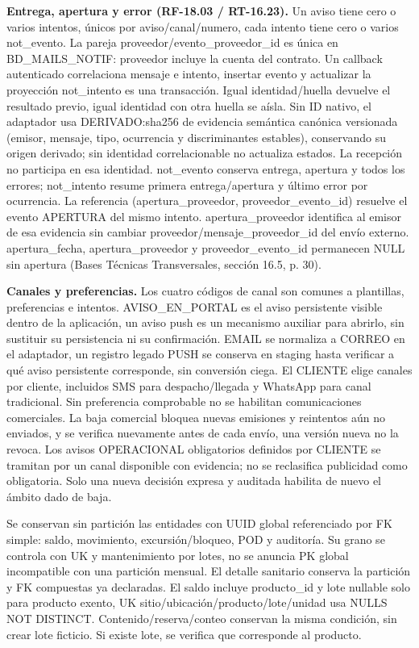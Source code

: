 \textbf{Entrega, apertura y error (RF-18.03 / RT-16.23).} Un aviso tiene cero o varios intentos, únicos por aviso/canal/numero, cada intento tiene cero o varios not\_evento. La pareja proveedor/evento\_proveedor\_id es única en BD\_MAILS\_NOTIF: proveedor incluye la cuenta del contrato. Un callback autenticado correlaciona mensaje e intento, insertar evento y actualizar la proyección not\_intento es una transacción. Igual identidad/huella devuelve el resultado previo, igual identidad con otra huella se aísla. Sin ID nativo, el adaptador usa DERIVADO:sha256 de evidencia semántica canónica versionada (emisor, mensaje, tipo, ocurrencia y discriminantes estables), conservando su origen derivado; sin identidad correlacionable no actualiza estados. La recepción no participa en esa identidad. not\_evento conserva entrega, apertura y todos los errores; not\_intento resume primera entrega/apertura y último error por ocurrencia. La referencia (apertura\_proveedor, proveedor\_evento\_id) resuelve el evento APERTURA del mismo intento. apertura\_proveedor identifica al emisor de esa evidencia sin cambiar proveedor/mensaje\_proveedor\_id del envío externo. apertura\_fecha, apertura\_proveedor y proveedor\_evento\_id permanecen NULL sin apertura (Bases Técnicas Transversales, sección 16.5, p. 30).

\textbf{Canales y preferencias.} Los cuatro códigos de canal son comunes a plantillas, preferencias e intentos. AVISO\_EN\_PORTAL es el aviso persistente visible dentro de la aplicación, un aviso push es un mecanismo auxiliar para abrirlo, sin sustituir su persistencia ni su confirmación. EMAIL se normaliza a CORREO en el adaptador, un registro legado PUSH se conserva en staging hasta verificar a qué aviso persistente corresponde, sin conversión ciega. El CLIENTE elige canales por cliente, incluidos SMS para despacho/llegada y WhatsApp para canal tradicional. Sin preferencia comprobable no se habilitan comunicaciones comerciales. La baja comercial bloquea nuevas emisiones y reintentos aún no enviados, y se verifica nuevamente antes de cada envío, una versión nueva no la revoca. Los avisos OPERACIONAL obligatorios definidos por CLIENTE se tramitan por un canal disponible con evidencia; no se reclasifica publicidad como obligatoria. Solo una nueva decisión expresa y auditada habilita de nuevo el ámbito dado de baja.

Se conservan sin partición las entidades con UUID global referenciado por FK simple: saldo, movimiento, excursión/bloqueo, POD y auditoría. Su grano se controla con UK y mantenimiento por lotes, no se anuncia PK global incompatible con una partición mensual. El detalle sanitario conserva la partición y FK compuestas ya declaradas. El saldo incluye producto\_id y lote nullable solo para producto exento, UK sitio/ubicación/producto/lote/unidad usa NULLS NOT DISTINCT. Contenido/reserva/conteo conservan la misma condición, sin crear lote ficticio. Si existe lote, se verifica que corresponde al producto.


